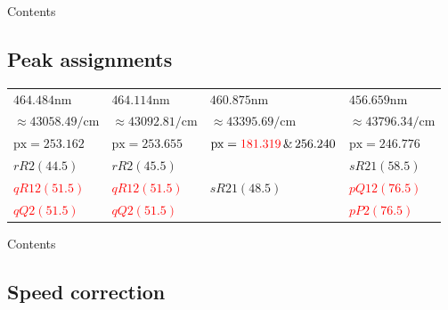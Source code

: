 \documentclass[aspectratio=43,handout]{ctexbeamer}
\begin{document}
\begin{frame}{Contents}
\end{frame}
\subsection{Peak assignments}
\begin{frame}{\insertsubsection}
			\begin{table}
			\centering  	 
			\scriptsize
			\begin{tabularx}{0.97\textwidth}{llll}    
				\toprule   
				$464.484 \unit{\nano \meter}$ &$464.114\unit{\nano \meter}$&$460.875 \unit{\nano \meter}$& $456.659 \unit{\nano \meter}$\\
				$\approx43058.49 \unit{\per \centi \meter}$ &   $\approx43092.81\unit{\per \centi \meter}$ &  $\approx 43395.69\unit{\per \centi \meter}$ & $\approx 43796.34\unit{\per \centi \meter} $\\
				\midrule   
				$\text{px}=253.162$ & $\text{px}=253.655$ & $\text{px}=\textcolor{red}{181.319}\,\&\,256.240$ &$ \text{px}=246.776$ \\  
				\midrule 
				$rR2\left( 44.5\right) $ & $rR2\left( 45.5\right) $ &  &$sR21\left( 58.5\right) $\\  
				\textcolor{red}{$qR12\left( 51.5\right) $} & \textcolor{red}{$qR12 \left( 51.5\right) $} &  $sR21\left( 48.5\right) $ & \textcolor{red}{$pQ12 \left( 76.5\right) $} \\ 
				\textcolor{red}{$qQ2\left(  51.5\right) $} & \textcolor{red}{$qQ2\left(  51.5\right) $} &   & \textcolor{red}{$pP2\left(  76.5\right) $} \\ 
				\bottomrule    
			\end{tabularx}%
		\end{table}%
	\end{frame}
	\begin{frame}{Contents}
	\end{frame}
	\subsection{Speed correction}
\end{document}
